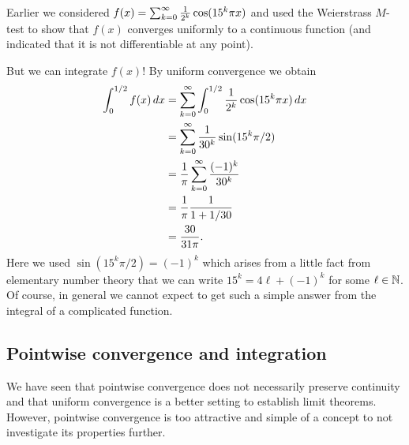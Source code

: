 \documentclass[10pt, a4paper]{article}
\begin{document}
\begin{example}
    Earlier we considered $f(x) = \sum_{k = 0}^{\infty}\frac{1}{2 ^ k}\cos(15 ^ k\pi x)$ and used the Weierstrass $M$-test to show that $f(x)$ converges uniformly to a continuous function
    (and indicated that it is not differentiable at any point).

    But we can integrate $f(x)$!
    By uniform convergence we obtain
    \begin{align*}
        \int_{0}^{1 / 2}f(x)\,dx &= \sum_{k = 0}^{\infty}\int_{0}^{1 / 2}\frac{1}{2 ^ k}\cos(15 ^ k\pi x)\,dx \\
        &= \sum_{k = 0}^{\infty}\frac{1}{30 ^ k}\sin(15 ^ k\pi / 2) \\
        &= \frac{1}{\pi}\sum_{k = 0}^{\infty}\frac{(-1) ^ k}{30 ^ k} \\
        &= \frac{1}{\pi}\frac{1}{1 + 1 / 30} \\
        &= \frac{30}{31\pi}.
    \end{align*}
    Here we used $\sin(15 ^ k\pi / 2) = (-1) ^ k$ which arises from a little fact from elementary number theory that we can write $15 ^ k = 4\ell + (-1) ^ k$ for some $\ell \in \mathbb{N}$.
    Of course,
    in general we cannot expect to get such a simple answer from the integral of a complicated function.
\end{example}

\subsection{Pointwise convergence and integration}
We have seen that pointwise convergence does not necessarily preserve continuity and that uniform convergence is a better setting to establish limit theorems.
However,
pointwise convergence is too attractive and simple of a concept to not investigate its properties further.
\end{document}
